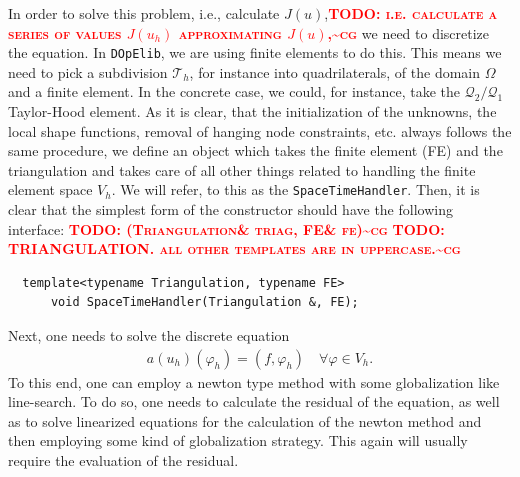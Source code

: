 \documentclass[prodmode,acmtoms]{acmsmall}
\numberwithin{equation}{section}
\renewcommand{\phi}{\varphi}
\newcommand{\dope}{\texttt{DOpElib}}
\newcommand{\todocg}[1]{\textbf{\textsc{\textcolor{red}{TODO: #1\textasciitilde cg}}}}
\begin{document}
In order to solve this problem, i.e., calculate $J(u)$,\todocg{i.e. calculate a series of values $J(u_h)$ approximating $J(u)$,} we need to discretize 
the equation. In \dope, we are using finite elements to do this. This means we need to pick a 
subdivision $\mathcal T_h$, for instance into quadrilaterals,
of the domain $\Omega$ and a finite element. In the concrete case, we could, 
for instance, take the $\mathcal Q_2/\mathcal Q_1$ Taylor-Hood element.
As it is clear, that the initialization of the unknowns, the local shape 
functions, removal of hanging node constraints, etc. always follows the 
same procedure, we define an object which takes the finite element (FE)
and the triangulation and takes care of all other things related to
handling the finite element space $V_h$. We will refer, to 
this as the \texttt{SpaceTimeHandler}. Then, it is clear that the simplest 
form of the constructor should have the following interface:
\todocg{(Triangulation\& triag, FE\& fe)}
\todocg{TRIANGULATION. all other templates are in uppercase.}
\begin{lstlisting}
  template<typename Triangulation, typename FE>
      void SpaceTimeHandler(Triangulation &, FE);
\end{lstlisting}
Next, one needs to solve the discrete equation
\begin{align}\label{eq:discrete_equation}
a(u_h)(\phi_h) = (f,\phi_h) \quad \forall \phi \in V_h.
\end{align}
To this end, one can employ a newton type method with some globalization 
like line-search. To do so, one needs to calculate the residual of the 
equation, as well as to solve linearized equations for the calculation of 
the newton method and then employing some kind of globalization strategy.
This again will usually require the evaluation of the residual.
\end{document}
